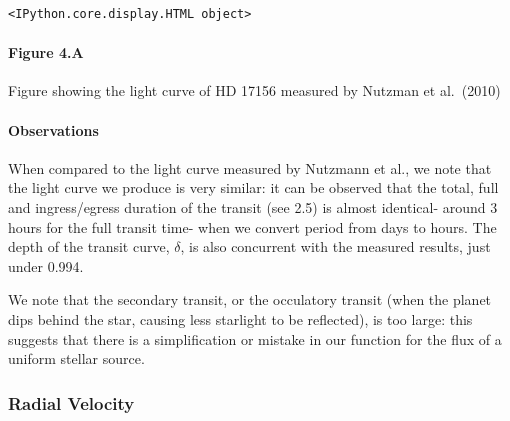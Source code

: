 \documentclass[11pt]{article}
\begin{document}
    
    
    \begin{Verbatim}[commandchars=\\\{\}]
<IPython.core.display.HTML object>
    \end{Verbatim}


    \hypertarget{figure-4.a}{%
\paragraph{Figure 4.A}\label{figure-4.a}}

Figure showing the light curve of HD 17156 measured by Nutzman et
al.~(2010)

    \hypertarget{observations}{%
\paragraph{Observations}\label{observations}}

When compared to the light curve measured by Nutzmann et al., we note
that the light curve we produce is very similar: it can be observed that
the total, full and ingress/egress duration of the transit (see 2.5) is
almost identical- around 3 hours for the full transit time- when we
convert period from days to hours. The depth of the transit curve,
\(\delta\), is also concurrent with the measured results, just under
0.994.

We note that the secondary transit, or the occulatory transit (when the
planet dips behind the star, causing less starlight to be reflected), is
too large: this suggests that there is a simplification or mistake in
our function for the flux of a uniform stellar source.

    \hypertarget{radial-velocity}{%
\subsubsection{Radial Velocity}\label{radial-velocity}}
\end{document}
